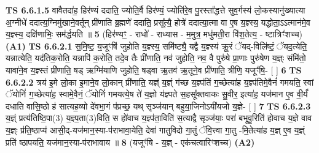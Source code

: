 \documentclass[17pt]{extarticle}
\begin{document}
                  \newline
                                \textbf{ TS 6.6.1.5} \newline
                  वावैतदा॑ह॒ हिर॑ण्यं ददाति॒ ज्योति॒र्वै हिर॑ण्यं॒ ज्योति॑रे॒व पु॒रस्ता᳚द्धत्ते सुव॒र्गस्य॑ लो॒कस्यानु॑ख्यात्या अ॒ग्नीधे॑ ददात्य॒ग्निमु॑खाने॒वर्तून् प्री॑णाति ब्र॒ह्मणे॑ ददाति॒ प्रसू᳚त्यै॒ होत्रे॑ ददात्या॒त्मा वा ए॒ष य॒ज्ञ्स्य॒ यद्धोता॒ऽऽत्मान॑मे॒व य॒ज्ञ्स्य॒ दक्षि॑णाभिः॒ सम॑र्द्धयति ॥ \textbf{  5} \newline
                  \newline
                      (हिर॑ण्यꣳ॒॒ - राधो॑ - राध्यास - म॒मुत्र॒ मधु॑मती॒रा वि॑श॒तेत्य॒ - ष्टात्रिꣳ॑शच्च)  \textbf{(A1)} \newline \newline
                                        \textbf{ TS 6.6.2.1} \newline
                  स॒मि॒ष्ट॒ य॒जूꣳषि॑ जुहोति य॒ज्ञ्स्य॒ समि॑ष्ट्यै॒ यद्वै य॒ज्ञ्स्य॑ क्रू॒रं ॅयद्-विलि॑ष्टं॒ ॅयद॒त्येति॒ यन्नात्येति॒ यद॑तिक॒रोति॒ यन्नापि॑ क॒रोति॒ तदे॒व तैः प्री॑णाति॒ नव॑ जुहोति॒ नव॒ वै पुरु॑षे प्रा॒णाः पुरु॑षेण य॒ज्ञ्ः संमि॑तो॒ यावा॑ने॒व य॒ज्ञ्स्तं प्री॑णाति॒ षड् ऋग्मि॑याणि जुहोति॒ षड्वा ऋ॒तव॑ ऋ॒तूने॒व प्री॑णाति॒ त्रीणि॒ यजूꣳ॑षि॒- [  ] \textbf{  6} \newline
                  \newline
                                \textbf{ TS 6.6.2.2} \newline
                  त्रय॑ इ॒मे लो॒का इ॒माने॒व लो॒कान् प्री॑णाति॒ यज्ञ्॑ य॒ज्ञ्ं ग॑च्छ य॒ज्ञ्प॑तिं ग॒च्छेत्या॑ह य॒ज्ञ्प॑तिमे॒वैनं॑ गमयति॒ स्वां ॅयोनिं॑ ग॒च्छेत्या॑ह॒ स्वामे॒वैनं॒ ॅयोनिं॑ गमयत्ये॒ष ते॑ य॒ज्ञो य॑ज्ञ्पते स॒हसू᳚क्तवाकः सु॒वीर॒ इत्या॑ह॒ यज॑मान ए॒व वी॒र्यं॑ दधाति वासि॒ष्ठो ह॑ सात्यह॒व्यो दे॑वभा॒गं प॑प्रच्छ॒ यथ् सृञ्ज॑यान् बहुया॒जिनोऽयी॑यजो य॒ज्ञे- [  ] \textbf{  7} \newline
                  \newline
                                \textbf{ TS 6.6.2.3} \newline
                  य॒ज्ञ्ं प्रत्य॑तिष्ठि॒पा(3) य॒ज्ञ्प॒ता(3)विति॒ स हो॑वाच य॒ज्ञ्प॑ता॒विति॑ स॒त्याद्वै सृञ्ज॑याः॒ परा॑ बभूवु॒रिति॑ होवाच य॒ज्ञे वाव य॒ज्ञ्ः प्र॑ति॒ष्ठाप्य॑ आसी॒द्-यज॑मान॒स्या-प॑राभावा॒येति॒ देवा॑ गातुविदो गा॒तुं ॅवि॒त्त्वा गा॒तु -मि॒तेत्या॑ह य॒ज्ञ् ए॒व य॒ज्ञ्ं प्रति॑ ष्ठापयति॒ यज॑मान॒स्या-प॑राभावाय ॥ \textbf{  8} \newline
                  \newline
                      (यजूꣳ॑षि - य॒ज्ञ् - एक॑चत्वारिꣳशच्च)  \textbf{(A2)} \newline \newline
\end{document}
